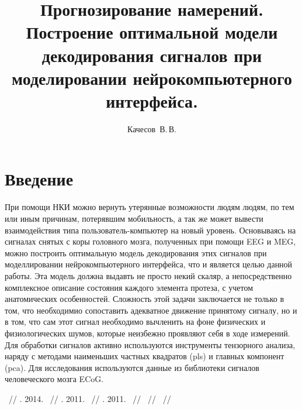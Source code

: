 \documentclass[12pt,twoside]{article}
\title
    [Построение модели декодирования сигналов при моделировании нейрокомпьютерного интерфейса. ] %
    {Прогнозирование намерений. Построение оптимальной модели декодирования сигналов при моделировании нейрокомпьютерного интерфейса.}
\author
    {Качесов~В.\,В.} %
\begin{document}
\maketitle

\section {Введение}
    {При помощи НКИ можно вернуть утерянные возможности людям людям, по тем или иным причинам, потерявшим мобильность, а так же может вывести взаимодействия типа пользователь-компьютер на новый уровень. Основываясь на сигналах снятых с коры головного мозга, полученных при помощи EEG и MEG, можно построить оптимальную модель декодирования этих сигналов при моделлировании нейрокомпьютерного интерфейса, что и является целью данной работы. Эта модель должна выдавть не просто некий скаляр, а непосредственно комплексное описание состояния каждого элемента протеза, с учетом анатомических особенностей. Сложность этой задачи заключается не только в том, что необходимио сопоставить адекватное движение принятому сигналу, но и в том, что сам этот сигнал необходимо вычленить на фоне физических и физиологических шумов, которые неизбежно проявляют себя в ходе измерений\cite{Sotnikov}. Для обработки сигналов активно используются инструменты тензорного анализа\cite{Eliseyev1}\cite{Eliseyev2}, наряду с методами наименьших частных квадратов (pls)\cite{Ng.}  и главных компонент (pca)\cite{Brems}. Для исследования используются данные из библиотеки сигналов человеческого мозга ECoG\cite{Miller}.
}

\begin{thebibliography}{}
    ~//
    . 2014.
    ~//
    . 2011.
    ~//
    . 2011.
    ~//
    ~//
    ~//

\end{thebibliography}
\end{document}
